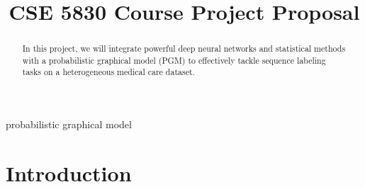 \documentclass[conference]{IEEEtran}
\begin{document}
\title{CSE 5830 Course Project Proposal}

\author{
\and
{}
\and
{}
}

\maketitle

\begin{abstract}
In this project, we will integrate powerful deep neural networks and
statistical methods with a probabilistic graphical model (PGM) to effectively
tackle sequence labeling tasks on a heterogeneous medical care dataset.
\end{abstract}


\begin{IEEEkeywords}
probabilistic graphical model
\end{IEEEkeywords}


\section{Introduction}

\citep{huang2015bidirectional}




\end{document}
